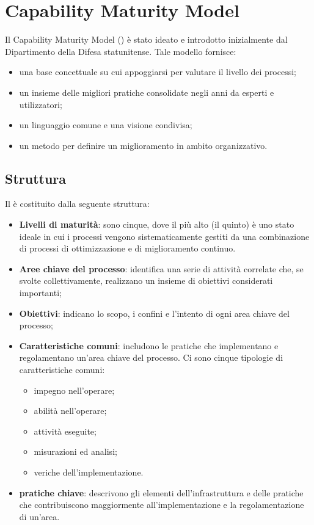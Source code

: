 \documentclass[PianoDiQualifica.tex]{subfiles}
\begin{document}
\hypertarget{CMM_label}{\section{Capability Maturity Model}}
	Il Capability Maturity Model () è stato ideato e introdotto inizialmente dal Dipartimento della Difesa statunitense. Tale modello
	fornisce:
	\begin{itemize}
		\item una base concettuale su cui appoggiarsi per valutare il livello dei processi;
		\item un insieme delle migliori pratiche consolidate negli anni da esperti e utilizzatori;
		\item un linguaggio comune e una visione condivisa;
		\item un metodo per definire un miglioramento in ambito organizzativo.
	\end{itemize}
	\subsection{Struttura}
	Il  è costituito dalla seguente struttura:
	\begin{itemize}
		\item \textbf{Livelli di maturità}: sono cinque, dove il più alto (il quinto) è uno stato ideale in cui i processi vengono sistematicamente
		gestiti da una combinazione di processi di ottimizzazione e di miglioramento continuo. 
		\item \textbf{Aree chiave del processo}: identifica una serie di attività correlate che, se svolte collettivamente,
		realizzano un insieme di obiettivi considerati importanti;
		\item \textbf{Obiettivi}: indicano lo scopo, i confini e l'intento di ogni area chiave del processo;
		\item \textbf{Caratteristiche comuni}: includono le pratiche che implementano e regolamentano un'area chiave del processo. Ci sono cinque
		tipologie di caratteristiche comuni:
		\begin{itemize}
			\item impegno nell'operare;
			\item abilità nell'operare;
			\item attività eseguite;
			\item misurazioni ed analisi;
			\item veriche dell'implementazione.
		\end{itemize}
		\item \textbf{pratiche chiave}: descrivono gli elementi dell'infrastruttura e delle pratiche che contribuiscono maggiormente all'implementazione
		e la regolamentazione di un'area.
	\end{itemize}
	
\end{document}
